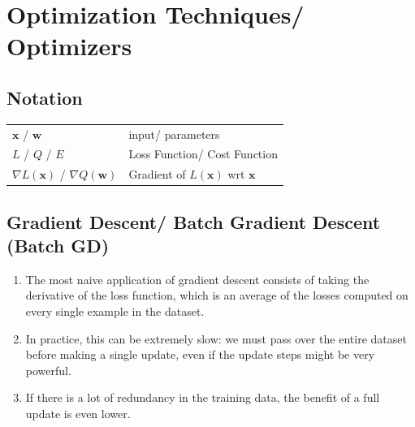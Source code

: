 \chapter{Optimization Techniques/ Optimizers}

\section*{Notation}

\begin{customTableWrapper}{1.5}
\begin{table}[h]
    \begin{tabular}{l l}
        $\mathbf{x}$ / $\mathbf{w}$ & input/ parameters \\
        
        $L$ / $Q$ / $E$ & Loss Function/ Cost Function \\

        $\nabla L(\mathbf{x})$ / $\nabla Q(\mathbf{w})$ & Gradient of $L(\mathbf{x})$ wrt $\mathbf{x}$ \\
    \end{tabular}
\end{table}
\end{customTableWrapper}






\section{Gradient Descent/ Batch Gradient Descent (Batch GD) \cite{dnn-1}}\label{Batch Gradient Descent (Batch GD)}

\begin{enumerate}[itemsep=0.2cm]
    \item The most naive application of gradient descent consists of taking the derivative of the loss function, which is an average of the losses computed on every single example in the dataset.

    \item In practice, this can be extremely slow: we must pass over the entire dataset before making a single update, even if the update steps might be very powerful.

    \item If there is a lot of redundancy in the training data, the benefit of a full update is even lower.

\end{enumerate}





